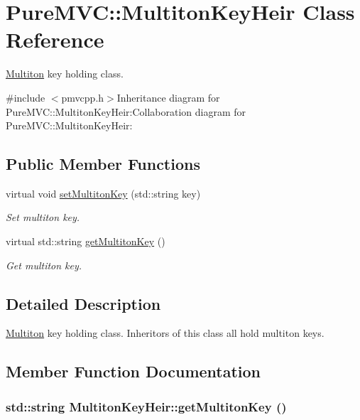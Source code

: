 \hypertarget{class_pure_m_v_c_1_1_multiton_key_heir}{
\section{PureMVC::MultitonKeyHeir Class Reference}
\label{class_pure_m_v_c_1_1_multiton_key_heir}
}


\hyperlink{class_pure_m_v_c_1_1_multiton}{Multiton} key holding class.  


{\ttfamily \#include $<$pmvcpp.h$>$}Inheritance diagram for PureMVC::MultitonKeyHeir:Collaboration diagram for PureMVC::MultitonKeyHeir:\subsection*{Public Member Functions}
\begin{DoxyCompactItemize}
\item 
virtual void \hyperlink{class_pure_m_v_c_1_1_multiton_key_heir_abc70ef7c066bc8d7bf0196ec727599bb}{setMultitonKey} (std::string key)
\begin{DoxyCompactList}\small\item\em Set multiton key. \item\end{DoxyCompactList}\item 
virtual std::string \hyperlink{class_pure_m_v_c_1_1_multiton_key_heir_aa5622459d33380deb08dc3cab8b991c7}{getMultitonKey} ()
\begin{DoxyCompactList}\small\item\em Get multiton key. \item\end{DoxyCompactList}\end{DoxyCompactItemize}


\subsection{Detailed Description}
\hyperlink{class_pure_m_v_c_1_1_multiton}{Multiton} key holding class. Inheritors of this class all hold multiton keys. 

\subsection{Member Function Documentation}
\hypertarget{class_pure_m_v_c_1_1_multiton_key_heir_aa5622459d33380deb08dc3cab8b991c7}{
\subsubsection[{getMultitonKey}]{\setlength{\rightskip}{0pt plus 5cm}std::string MultitonKeyHeir::getMultitonKey ()}}
\label{class_pure_m_v_c_1_1_multiton_key_heir_aa5622459d33380deb08dc3cab8b991c7}



